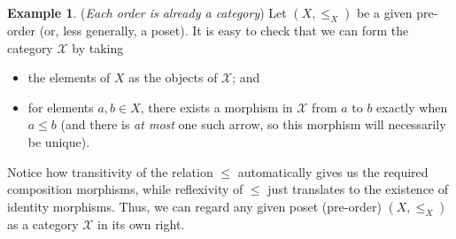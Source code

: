\documentclass[11pt]{book}
\theoremstyle{definition}
\newtheorem{example}{Example}[section]
\theoremstyle{definition}
\theoremstyle{definition}
\theoremstyle{theorem}
\theoremstyle{definition}
\begin{document}
\begin{example}
	(\textit{Each order is already a category}) Let $(X, \leq_X)$ be a given pre-order (or, less generally, a poset). It is easy to check that we can form the category $\mathcal{X}$ by taking 
	\begin{itemize}
		\item the elements of $X$ as the objects of $\mathcal{X}$; and  
		\item for elements $a, b \in X$, there exists a morphism in $\mathcal{X}$ from $a$ to $b$ exactly when $a \leq b$ (and there is \textit{at most} one such arrow, so this morphism will necessarily be unique). 
	\end{itemize}
Notice how transitivity of the relation $\leq$ automatically gives us the required composition morphisms, while reflexivity of $\leq$ just translates to the existence of identity morphisms. Thus, we can regard any given poset (pre-order) $(X, \leq_X)$ as a category $\mathcal{X}$ in its own right.  
\end{example}
\end{document}
